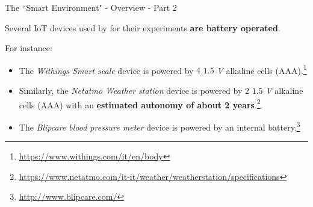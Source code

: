 \documentclass[10pt]{beamer}
\begin{document}
\begin{frame}{The ``Smart Environment" - Overview - Part 2}

\begin{block}{}
\justifying
Several IoT devices used by \citet{ITPAReport} for their experiments \textbf{are battery operated}. 

For instance:

\begin{itemize}
\justifying
\item The \textit{Withings Smart scale} device is powered by $4$ $1.5$ \textit{V} alkaline cells (AAA).\footnote{\url{https://www.withings.com/it/en/body}}

\item Similarly, the \textit{Netatmo Weather station} device is powered by $2$ $1.5$ \textit{V} alkaline cells (AAA) with an \textbf{estimated autonomy of about 2 years}.\footnote{\url{https://www.netatmo.com/it-it/weather/weatherstation/specifications}
}
\item The \textit{Blipcare blood pressure meter} device is powered by an internal battery.\footnote{\url{http://www.blipcare.com/}}
\end{itemize} 

\end{block}

\end{frame} 
\end{document}
